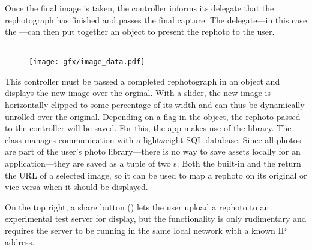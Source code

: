 
\subsubsection*{}

Once the final image is taken, the controller informs its delegate that the
rephotograph has finished and passes the final capture. The delegate---in this
case the ---can then put together an
 object to present the rephoto to the user.

\subsection{}

\setlength\intextsep{0pt}
\begin{figure}
   \texttt{[image: gfx/image\_data.pdf]}
\end{figure}

This controller must be passed a completed rephotograph in an 
object and displays the new image over the orginal.  With a slider, the new
image is horizontally clipped to some percentage of its width and can thus be
dynamically unrolled over the original. Depending on a flag in the
 object, the rephoto passed to the controller will be saved. For
this, the app makes use of the  library. The  class
manages communication with a lightweight SQL database. Since all photos are part
of the user's photo library---there is no way to save assets locally for an
application---they are saved as a tuple of two s. Both the built-in
 and the  return
the URL of a selected image, so it can be used to map a rephoto on its original
or vice versa when it should be displayed.


On the top right, a share button ()
lets the user upload a rephoto to an experimental test server for display, but the
functionality is only rudimentary and requires the server to be running in the
same local network with a known IP address.

